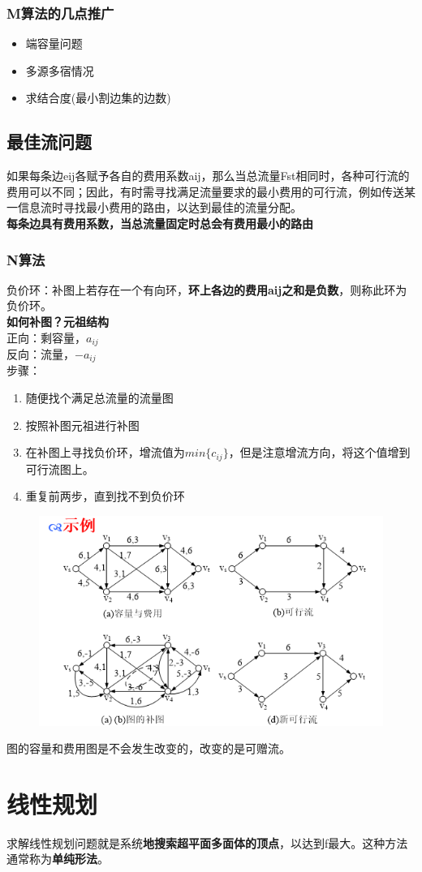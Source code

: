 \subsubsection{M算法的几点推广
}
\begin{itemize}
	\item 端容量问题
	\item 多源多宿情况
	\item 求结合度(最小割边集的边数)
\end{itemize}


\subsection{最佳流问题}
如果每条边eij各赋予各自的费用系数aij，那么当总流量Fst相同时，各种可行流的费用可以不同；因此，有时需寻找满足流量要求的最小费用的可行流，例如传送某一信息流时寻找最小费用的路由，以达到最佳的流量分配。\\
\textbf{每条边具有费用系数，当总流量固定时总会有费用最小的路由}

\subsubsection{N算法}
负价环：补图上若存在一个有向环，\textbf{环上各边的费用aij之和是负数}，则称此环为负价环。\\
\textbf{如何补图？元祖结构}\\
正向：剩容量，$ a_{ij} $\\
反向：流量，$ -a_{ij} $\\
\vspace{2pt}
步骤：
\begin{enumerate}
	\item 随便找个满足总流量的流量图
	\item 按照补图元祖进行补图
	\item 在补图上寻找负价环，增流值为$ min\{c_{ij}\} $，但是注意增流方向，将这个值增到可行流图上。
	\item 重复前两步，直到找不到负价环
\end{enumerate}
\begin{figure}[H]
	\centering
	\includegraphics[width=0.7\linewidth]{figures/screenshot084}
	\caption{}
	\label{fig:screenshot084}
\end{figure}
图的容量和费用图是不会发生改变的，改变的是可赠流。

\section{线性规划}
求解线性规划问题就是系统\textbf{地搜索超平面多面体的顶点}，以达到f最大。这种方法通常称为\textbf{单纯形法}。
